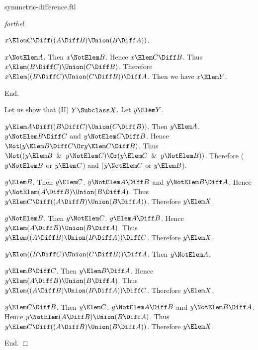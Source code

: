 \documentclass{stex}
\begin{document}
\begin{smodule}{symmetric-difference.ftl}
\begin{proof}[forthel]
\begin{case}{$x \Elem C \Diff ((A \Diff B) \Union (B \Diff A))$.}
      \begin{case}{$x \NotElem A$.}
        Then $x \NotElem B$.
        Hence $x \Elem C \Diff B$.
        Thus $x \Elem (B \Diff C) \Union (C \Diff B)$.
        Therefore $x \Elem ((B \Diff C) \Union (C \Diff B)) \Diff A$.
        Then we have $x \Elem Y$.
      \end{case}
    \end{case}
  End.

  Let us show that (II) $Y \Subclass X$.
    Let $y \Elem Y$.

    \begin{case}{$y \Elem A \Diff ((B \Diff C) \Union (C \Diff B))$.}
      Then $y \Elem A$.
      $y \NotElem B \Diff C$ and $y \NotElem C \Diff B$.
      Hence $\Not(y \Elem B \Diff C \Or y \Elem C \Diff B)$.
      Thus $\Not((y \Elem B \And y \NotElem C) \Or (y \Elem C \And y \NotElem B))$.
      Therefore ($y \NotElem B$ or $y \Elem C$) and ($y \NotElem C$ or $y \Elem B$).

      \begin{case}{$y \Elem B$.}
        Then $y \Elem C$.
        $y \NotElem A \Diff B$ and $y \NotElem B \Diff A$.
        Hence $y \NotElem (A \Diff B) \Union (B \Diff A)$.
        Thus $y \Elem C \Diff ((A \Diff B) \Union (B \Diff A))$.
        Therefore $y \Elem X$.
      \end{case}

      \begin{case}{$y \NotElem B$.}
        Then $y \NotElem C$.
        $y \Elem A \Diff B$.
        Hence $y \Elem (A \Diff B) \Union (B \Diff A)$.
        Thus $y \Elem ((A \Diff B) \Union (B \Diff A)) \Diff C$.
        Therefore $y \Elem X$.
      \end{case}
    \end{case}

    \begin{case}{$y \Elem ((B \Diff C) \Union (C \Diff B)) \Diff A$.}
      Then $y \NotElem A$.

      \begin{case}{$y \Elem B \Diff C$.}
        Then $y \Elem B \Diff A$.
        Hence $y \Elem (A \Diff B) \Union (B \Diff A)$.
        Thus $y \Elem ((A \Diff B) \Union (B \Diff A)) \Diff C$.
        Therefore $y \Elem X$.
      \end{case}

      \begin{case}{$y \Elem C \Diff B$.}
        Then $y \Elem C$.
        $y \NotElem A \Diff B$ and $y \NotElem B \Diff A$.
        Hence $y \NotElem (A \Diff B) \Union (B \Diff A)$.
        Thus $y \Elem C \Diff ((A \Diff B) \Union (B \Diff A))$.
        Therefore $y \Elem X$.
      \end{case}
    \end{case}
  End.
\end{proof}


\end{smodule}
\end{document}
